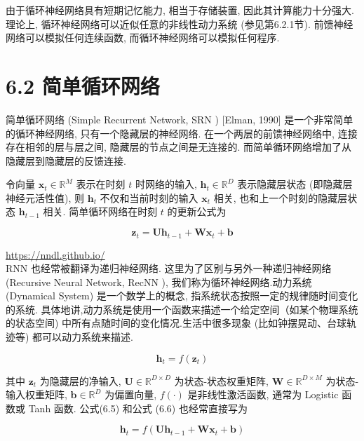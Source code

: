 \documentclass[10pt]{article}
\begin{document}
由于循环神经网络具有短期记忆能力, 相当于存储装置, 因此其计算能力十分强大. 理论上, 循环神经网络可以近似任意的非线性动力系统 (参见第6.2.1节). 前馈神经网络可以模拟任何连续函数, 而循环神经网络可以模拟任何程序.

\section*{6.2 简单循环网络}
简单循环网络 (Simple Recurrent Network, SRN ) [Elman, 1990] 是一个非常简单的循环神经网络, 只有一个隐藏层的神经网络. 在一个两层的前馈神经网络中, 连接存在相邻的层与层之间, 隐藏层的节点之间是无连接的. 而简单循环网络增加了从隐藏层到隐藏层的反馈连接.

令向量 $\boldsymbol{x}_{t} \in \mathbb{R}^{M}$ 表示在时刻 $t$ 时网络的输入, $\boldsymbol{h}_{t} \in \mathbb{R}^{D}$ 表示隐藏层状态 (即隐藏层神经元活性值), 则 $\boldsymbol{h}_{t}$ 不仅和当前时刻的输入 $\boldsymbol{x}_{t}$ 相关, 也和上一个时刻的隐藏层状态 $\boldsymbol{h}_{t-1}$ 相关. 简单循环网络在时刻 $t$ 的更新公式为


\begin{equation*}
\boldsymbol{z}_{t}=\boldsymbol{U} \boldsymbol{h}_{t-1}+\boldsymbol{W} \boldsymbol{x}_{t}+\boldsymbol{b} \tag{6.5}
\end{equation*}


\href{https://nndl.github.io/}{https://nndl.github.io/}\\
RNN 也经常被翻译为递归神经网络. 这里为了区别与另外一种递归神经网络 (Recursive Neural Network, RecNN ), 我们称为循环神经网络.动力系统 (Dynamical System) 是一个数学上的概念, 指系统状态按照一定的规律随时间变化的系统. 具体地讲,动力系统是使用一个函数来描述一个给定空间（如某个物理系统的状态空间) 中所有点随时间的变化情况.生活中很多现象 (比如钟摆晃动、台球轨迹等) 都可以动力系统来描述.


\begin{equation*}
\boldsymbol{h}_{t}=f\left(\boldsymbol{z}_{t}\right) \tag{6.6}
\end{equation*}


其中 $\boldsymbol{z}_{t}$ 为隐藏层的净输入, $\boldsymbol{U} \in \mathbb{R}^{D \times D}$ 为状态-状态权重矩阵, $\boldsymbol{W} \in \mathbb{R}^{D \times M}$ 为状态-输入权重矩阵, $\boldsymbol{b} \in \mathbb{R}^{D}$ 为偏置向量, $f(\cdot)$ 是非线性激活函数, 通常为 Logistic 函数或 Tanh 函数. 公式(6.5) 和公式 (6.6) 也经常直接写为


\begin{equation*}
\boldsymbol{h}_{t}=f\left(\boldsymbol{U} \boldsymbol{h}_{t-1}+\boldsymbol{W} \boldsymbol{x}_{t}+\boldsymbol{b}\right) \tag{6.7}
\end{equation*}
\end{document}
